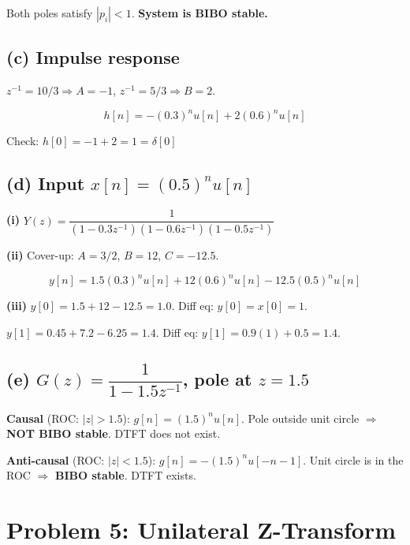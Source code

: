 \documentclass[11pt]{article}
\begin{document}
Both poles satisfy $|p_i| < 1$. \textbf{System is BIBO stable.}

\subsection*{(c) Impulse response}

$z^{-1}=10/3 \Rightarrow A = -1$, \quad $z^{-1}=5/3 \Rightarrow B = 2$.

\begin{equation*}
\boxed{h[n] = -(0.3)^n u[n] + 2(0.6)^n u[n]}
\end{equation*}

Check: $h[0] = -1 + 2 = 1 = \delta[0]$ \checkmark

\subsection*{(d) Input $x[n] = (0.5)^n u[n]$}

\textbf{(i)} $Y(z) = \dfrac{1}{(1 - 0.3z^{-1})(1 - 0.6z^{-1})(1 - 0.5z^{-1})}$

\textbf{(ii)} Cover-up: $A = 3/2$, \quad $B = 12$, \quad $C = -12.5$.

\begin{equation*}
\boxed{y[n] = 1.5(0.3)^n u[n] + 12(0.6)^n u[n] - 12.5(0.5)^n u[n]}
\end{equation*}

\textbf{(iii)} $y[0] = 1.5 + 12 - 12.5 = 1.0$. Diff eq: $y[0] = x[0] = 1$. \checkmark

$y[1] = 0.45 + 7.2 - 6.25 = 1.4$. Diff eq: $y[1] = 0.9(1) + 0.5 = 1.4$. \checkmark

\subsection*{(e) $G(z) = \dfrac{1}{1 - 1.5z^{-1}}$, pole at $z = 1.5$}

\textbf{Causal} (ROC: $|z| > 1.5$): $g[n] = (1.5)^n u[n]$. Pole outside unit circle $\Rightarrow$ \textbf{NOT BIBO stable}. DTFT does not exist.

\textbf{Anti-causal} (ROC: $|z| < 1.5$): $g[n] = -(1.5)^n u[-n-1]$. Unit circle is in the ROC $\Rightarrow$ \textbf{BIBO stable}. DTFT exists.

\section*{Problem 5: Unilateral Z-Transform}
\end{document}
